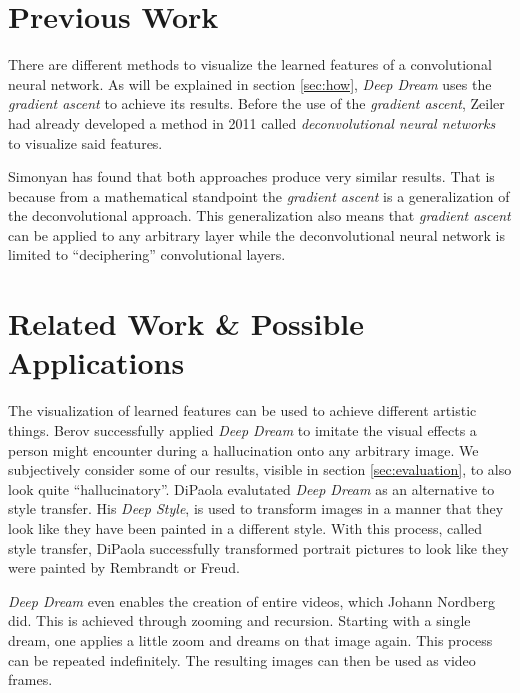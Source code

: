\section{Previous Work}
\label{sec:previous-work}
There are different methods to visualize the learned features of a convolutional neural network.
As will be explained in section \ref{sec:how}, \textit{Deep Dream} uses the \textit{gradient ascent} to achieve its results.
Before the use of the \textit{gradient ascent}, Zeiler had already developed a method in 2011 called \emph{deconvolutional neural networks} to visualize said features.\cite{zeiler2011adaptive}

Simonyan has found that both approaches produce very similar results.
That is because from a mathematical standpoint the \textit{gradient ascent} is a generalization of the deconvolutional approach.
This generalization also means that \textit{gradient ascent} can be applied to any arbitrary layer while the deconvolutional neural network is limited to \enquote{deciphering} convolutional layers.\cite{simonyan2013deep}

\section{Related Work \& Possible Applications}
The visualization of learned features can be used to achieve different artistic things.
Berov successfully applied \textit{Deep Dream} to imitate the visual effects a person might encounter during a hallucination onto any arbitrary image.\cite{berov2016visual}
We subjectively consider some of our results, visible in section \ref{sec:evaluation}, to also look quite \enquote{hallucinatory}.
DiPaola evalutated \textit{Deep Dream} as an alternative to style transfer.
His \emph{Deep Style}, is used to transform images in a manner that they look like they have been painted in a different style.\cite{dipaola2016using}
With this process, called style transfer, DiPaola successfully transformed portrait pictures to look like they were painted by Rembrandt or Freud.

\emph{Deep Dream} even enables the creation of entire videos, which Johann Nordberg did.\cite{deep-dream-video}
This is achieved through zooming and recursion.
Starting with a single dream, one applies a little zoom and dreams on that image again.
This process can be repeated indefinitely.
The resulting images can then be used as video frames.

